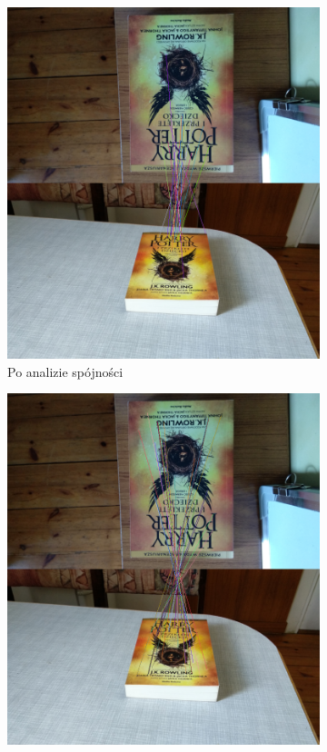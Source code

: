 \documentclass{article}
\begin{document}
\begin{figure}[H]
\begin{subfigure}[b]{0.4\linewidth}
			\includegraphics[width=\linewidth]{k1c.png}
			\caption{Po analizie spójności}
		\end{subfigure}
		\begin{subfigure}[b]{0.4\linewidth}
			\includegraphics[width=\linewidth]{k1m.png}

\end{subfigure}
\end{figure}
\end{document}
